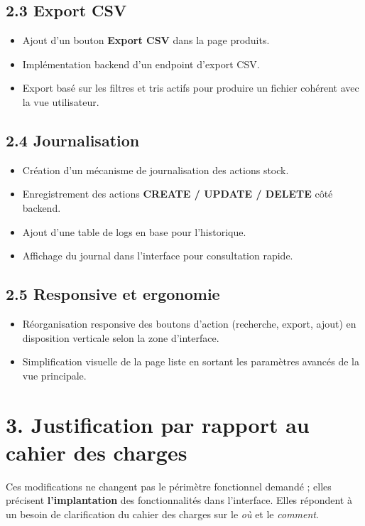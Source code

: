 \documentclass[12pt,a4paper]{article}
\begin{document}
\subsection*{2.3 Export CSV}
\begin{itemize}[leftmargin=1.2cm]
  \item Ajout d'un bouton \textbf{Export CSV} dans la page produits.
  \item Implémentation backend d'un endpoint d'export CSV.
  \item Export basé sur les filtres et tris actifs pour produire un fichier cohérent avec la vue utilisateur.
\end{itemize}

\subsection*{2.4 Journalisation}
\begin{itemize}[leftmargin=1.2cm]
  \item Création d'un mécanisme de journalisation des actions stock.
  \item Enregistrement des actions \textbf{CREATE / UPDATE / DELETE} côté backend.
  \item Ajout d'une table de logs en base pour l'historique.
  \item Affichage du journal dans l'interface pour consultation rapide.
\end{itemize}

\subsection*{2.5 Responsive et ergonomie}
\begin{itemize}[leftmargin=1.2cm]
  \item Réorganisation responsive des boutons d'action (recherche, export, ajout) en disposition verticale selon la zone d'interface.
  \item Simplification visuelle de la page liste en sortant les paramètres avancés de la vue principale.
\end{itemize}

\section*{3. Justification par rapport au cahier des charges}
Ces modifications ne changent pas le périmètre fonctionnel demandé ; elles précisent \textbf{l'implantation} des fonctionnalités dans l'interface. Elles répondent à un besoin de clarification du cahier des charges sur le \emph{où} et le \emph{comment}.
\end{document}
